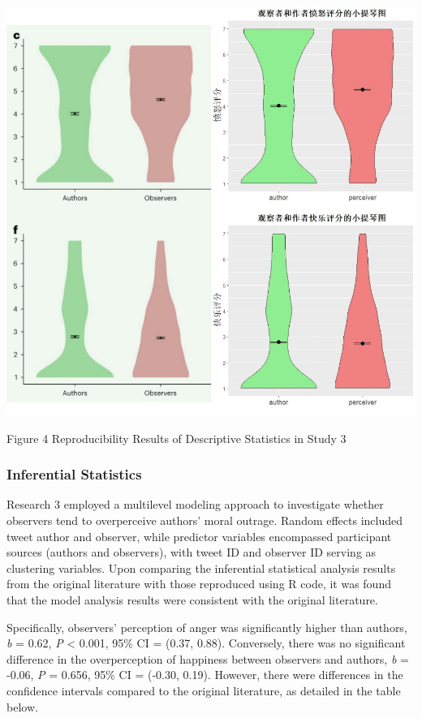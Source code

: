 \documentclass[
  man]{apa6}
\begin{document}
\begin{center}
\includegraphics{study3_Violin_Plot.png}
\end{center}
\begin{center}
Figure 4 Reproducibility Results of Descriptive Statistics in Study 3
\end{center}

\hypertarget{inferential-statistics-2}{%
\subsubsection{Inferential Statistics}\label{inferential-statistics-2}}

Research 3 employed a multilevel modeling approach to investigate whether observers tend to overperceive authors' moral outrage. Random effects included tweet author and observer, while predictor variables encompassed participant sources (authors and observers), with tweet ID and observer ID serving as clustering variables. Upon comparing the inferential statistical analysis results from the original literature with those reproduced using R code, it was found that the model analysis results were consistent with the original literature.

Specifically, observers' perception of anger was significantly higher than authors, \emph{b} = 0.62, \emph{P} \textless{} 0.001, 95\% CI = (0.37, 0.88). Conversely, there was no significant difference in the overperception of happiness between observers and authors, \emph{b} = -0.06, \emph{P} = 0.656, 95\% CI = (-0.30, 0.19). However, there were differences in the confidence intervals compared to the original literature, as detailed in the table below.
\end{document}
